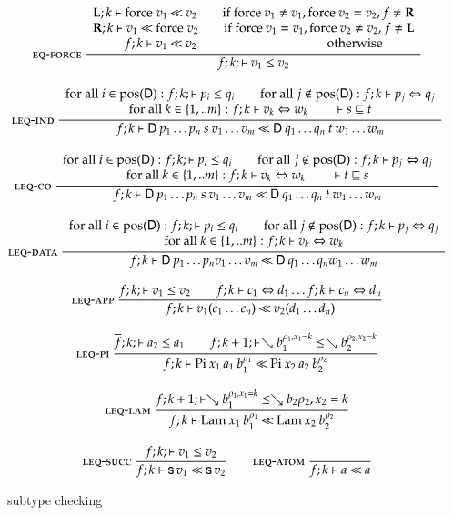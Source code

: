 \begin{figure}[p]
\begin{gather*}
\mbox{\sc eq-force}\ \dfrac{\begin{array}[b]{c}\mathbf{L};k\vdash\mathrm{force} \; v_1{\:\ll\:}v_2 \qquad \mbox{if } \mathrm{force} \: v_1 \neq v_1 , \mathrm{force} \: v_2 = v_2  , f \neq \mathbf{R}
\\\mathbf{R};k\vdash v_1{\:\ll\:}\mathrm{force} \; v_2 \qquad \mbox{if } \mathrm{force} \: v_1 = v_1 , \mathrm{force} \: v_2 \neq v_2 , f \neq \mathbf{L} \\f;k\vdash v_1{\:\ll\:}v_2 \qquad \qquad \qquad \qquad \qquad \mbox{ otherwise}\end{array}}{f;k;\vdash v_1\leq v_2}
\\[2ex]
\mbox{\sc leq-ind}\ \dfrac{\begin{array}[b]{c}\mbox{for all } i \in \mbox{pos}(\mathsf{D}): f;k;\vdash p_i\leq q_i 
\qquad
\mbox{for all } j \notin \mbox{pos}(\mathsf{D}): f;k\vdash p_j\Leftrightarrow q_j 
\\\mbox{for all } k \in \{1,..m\}: f;k\vdash v_k\Leftrightarrow w_k
\qquad
\vdash s\sqsubseteq t \end{array}}{f;k\vdash\mathsf{D} \: p_1 \ldots p_n \: s \: v_1 \ldots v_m{\:\ll\:}\mathsf{D} \: q_1 \ldots q_n \: t \: w_1 \ldots w_m}
\\[2ex]
\mbox{\sc leq-co}\ \dfrac{\begin{array}[b]{c}\mbox{for all } i \in \mbox{pos}(\mathsf{D}): f;k;\vdash p_i\leq q_i 
\qquad
\mbox{for all } j \notin \mbox{pos}(\mathsf{D}): f;k\vdash p_j\Leftrightarrow q_j\\\mbox{for all } k \in \{1,..m\}:f;k\vdash v_k\Leftrightarrow w_k
\qquad
\vdash t\sqsubseteq s \end{array}}{f;k\vdash\mathsf{D} \: p_1 \ldots p_n \: s \: v_1 \ldots v_m{\:\ll\:}\mathsf{D} \: q_1 \ldots q_n \: t \: w_1 \ldots w_m}
\\[2ex]
\mbox{\sc leq-data}\ \dfrac{\begin{array}[b]{c}\mbox{for all } i \in \mbox{pos}(\mathsf{D}): f;k;\vdash p_i\leq q_i 
\qquad
\mbox{for all } j \notin \mbox{pos}(\mathsf{D}): f;k\vdash p_j\Leftrightarrow q_j\\\mbox{for all } k \in \{1,..m\}:f;k\vdash v_k\Leftrightarrow w_k\end{array}}{f;k\vdash\mathsf{D} \: p_1 \ldots p_n v_1 \ldots v_m{\:\ll\:}\mathsf{D} \: q_1 \ldots q_n w_1 \ldots w_m}
\\[2ex]
\mbox{\sc leq-app}\ \dfrac{f;k;\vdash v_1\leq v_2 \qquad
f;k\vdash c_1\Leftrightarrow d_1 \ldots f;k\vdash c_n\Leftrightarrow d_n}{f;k\vdash v_1 (c_1 \ldots c_n){\:\ll\:}v_2 (d_1 \ldots d_n)}
\\[2ex]
\mbox{\sc leq-pi}\ \dfrac{\overline{f};k;\vdash a_2\leq a_1
\qquad
f;k+1;\vdash\searrow b_1^{\rho_1,x_1=k}\leq\searrow b_2^{\rho_2,x_2=k}}{f;k\vdash\mathrm{Pi} \: x_1 \: a_1 \: b_1^{\rho_1}{\:\ll\:}\mathrm{Pi} \: x_2 \: a_2 \: b_2^{\rho_2}}
\\[2ex]
\mbox{\sc leq-lam}\ \dfrac{f;k+1;\vdash\searrow b_1^{\rho_1,x_1=k}\leq\searrow{b_2}{\rho_2,x_2=k}}{f;k\vdash\mathrm{Lam} \: x_1 \: b_1^{\rho_1}{\:\ll\:}\mathrm{Lam} \: x_2 \: b_2^{\rho_2}}
\\[2ex]
\mbox{\sc leq-succ}\ \dfrac{f;k;\vdash v_1\leq v_2}{f;k\vdash\mathsf{s}\, v_1{\:\ll\:}\mathsf{s}\, v_2}
\qquad
\mbox{\sc leq-atom}\ \dfrac{}{f;k\vdash a{\:\ll\:}a}
\end{gather*}
\caption{subtype checking}
\end{figure}

